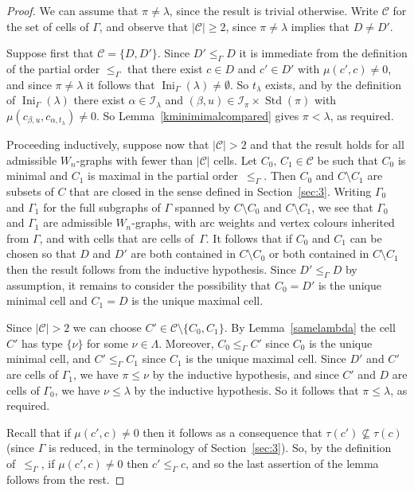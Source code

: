 \documentclass[ALCO,ThmDefs,Unicode,epreuves]{cedram}
\DeclareMathOperator{\Ini}{Ini}
\DeclareMathOperator{\STD}{Std}
\begin{document}
\begin{proof}
We can assume that $\pi\neq\lambda$, since the result is trivial otherwise.
Write $\mathcal{C}$ for the set of cells of $\Gamma$, and observe that
$|\mathcal{C}|\geqslant 2$, since $\pi\neq\lambda$ implies that $D\ne D'$.

Suppose first that $\mathcal{C}=\{D,D'\}$. Since $D'\leqslant_{\Gamma} D$
it is immediate from the definition of the partial order $\leqslant_{\Gamma}$
that there exist $c\in D$ and $c'\in D'$ with $\mu(c',c) \neq 0$, and
since $\pi\ne\lambda$ it follows that $\Ini_\Gamma(\lambda)\ne\emptyset$.
So $t_\lambda$ exists, and by the definition of $\Ini_\Gamma(\lambda)$
there exist $\alpha\in\mathcal{I}_\lambda$ and
$(\beta,u)\in\mathcal{I}_\pi\times\STD(\pi)$ with
$\mu(c_{\beta,u},c_{\alpha,t_\lambda})\ne 0$.
So Lemma~\ref{kminimimalcompared} gives $\pi<\lambda$, as required.

Proceeding inductively, suppose now that $|\mathcal{C}|>2$ and that the result
holds for all admissible $W_n$-graphs with fewer than $|\mathcal{C}|$ cells.
Let $C_0,\,C_1\in\mathcal{C}$ be such that $C_0$ is minimal and $C_1$
is maximal in the partial order~$\leqslant_{\Gamma}$. Then $C_0$ and
$C\setminus C_1$ are subsets of $C$ that are closed in the sense defined
in Section~\ref{sec:3}. Writing $\Gamma_0$ and $\Gamma_1$ for the full
subgraphs of $\Gamma$ spanned by $C\setminus C_0$ and $C\setminus C_1$,
we see that $\Gamma_0$ and $\Gamma_1$ are admissible $W_n$-graphs, with
arc weights and vertex colours inherited from $\Gamma$, and with cells
that are cells of~$\Gamma$. It follows that if $C_0$ and $C_1$ can be
chosen so that $D$ and $D'$ are both contained in $C\setminus C_0$ or both
contained in $C\setminus C_1$ then the result follows from the inductive
hypothesis. Since $D'\leqslant_{\Gamma} D$ by assumption, it remains to
consider the possibility that $C_0=D'$ is the unique minimal cell and
$C_1=D$ is the unique maximal cell.

Since $|\mathcal{C}|>2$ we can choose $C'\in\mathcal{C}\setminus\{C_0,C_1\}$.
By Lemma~\ref{samelambda} the cell $C'$ has type $\{\nu\}$ for some
$\nu\in\Lambda$. Moreover, $C_0\leqslant_{\Gamma} C'$ since $C_0$ is the
unique minimal cell, and $C'\leqslant_{\Gamma}C_1$ since $C_1$ is the
unique maximal cell. Since $D'$ and $C'$ are cells of $\Gamma_1$, we have
$\pi\leqslant\nu$ by the inductive hypothesis, and since
$C'$ and $D$ are cells of $\Gamma_0$, we have $\nu\leqslant\lambda$
by the inductive hypothesis. So it follows that $\pi\leq\lambda$, as required.

Recall that if $\mu(c',c)\ne0$ then it follows as a consequence that
$\tau(c')\nsubseteq\tau(c)$ (since $\Gamma$ is reduced, in the
terminology of Section~\ref{sec:3}). So, by the definition of~$\leqslant_{\Gamma}$,
if $\mu(c',c)\ne0$ then $c'\leqslant_{\Gamma}c$, and so the last
assertion of the lemma follows from the rest.
\end{proof}
\end{document}
